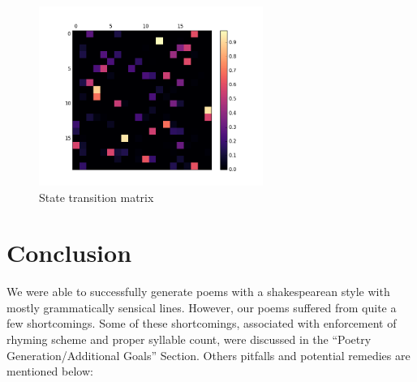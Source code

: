 \begin{figure}[H]
	\centering
	\includegraphics[width=0.65\textwidth, clip=true, trim=1cm 1cm 1cm 1cm]{transition_matrix}
	\caption{State transition matrix}\label{fig:state-transition}
\end{figure}

\section{Conclusion}

We were able to successfully generate poems with a shakespearean style with mostly grammatically sensical lines. However, our poems suffered from quite a few shortcomings. Some of these shortcomings, associated with enforcement of rhyming scheme and proper syllable count, were discussed in the ``Poetry Generation/Additional Goals'' Section. Others pitfalls and potential remedies are mentioned below:

